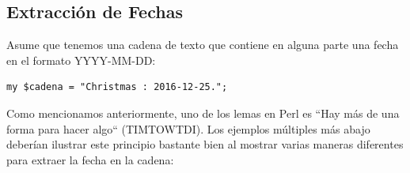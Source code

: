 \subsection{Extracción de Fechas}
\label{extracting_dates}

Asume que tenemos una cadena de texto que contiene en
alguna parte una fecha en el formato YYYY-MM-DD:

\begin{lstlisting}
my $cadena = "Christmas : 2016-12-25.";
\end{lstlisting}
%

Como mencionamos anteriormente, uno de los lemas en Perl es
``Hay más de una forma para hacer algo`` (TIMTOWTDI). Los ejemplos
múltiples más abajo deberían ilustrar este principio bastante 
bien al mostrar varias maneras diferentes para extraer la fecha
en la cadena:

